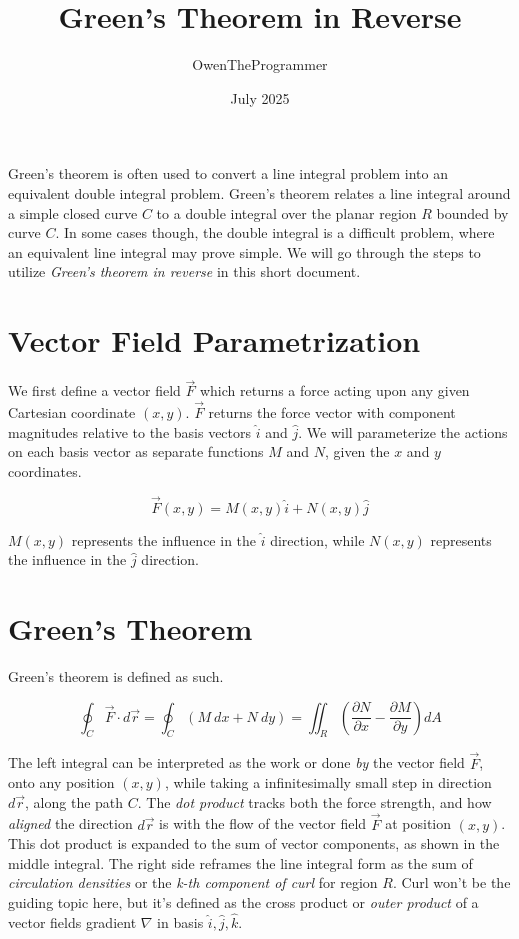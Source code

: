 \documentclass{article}
\title{Green's Theorem in Reverse}
\author{OwenTheProgrammer}
\date{July 2025}
\begin{document}
\maketitle

Green's theorem is often used to convert a line integral problem into an equivalent double integral problem. Green's theorem relates a line integral around a simple closed curve $C$ to a double integral over the planar region $R$ bounded by curve $C$. In some cases though, the double integral is a difficult problem, where an equivalent line integral may prove simple. We will go through the steps to utilize \emph{Green's theorem in reverse} in this short document.

\section{Vector Field Parametrization}

We first define a vector field $\vec{F}$ which returns a force acting upon any given Cartesian coordinate $(x, y)$. $\vec{F}$ returns the force vector with component magnitudes relative to the basis vectors $\hat{i}$ and $\hat{j}$. We will parameterize the actions on each basis vector as separate functions $M$ and $N$, given the $x$ and $y$ coordinates.

\begin{equation}\label{eq:VectorField}
    \vec{F}(x, y) = M(x, y)\hat{i} + N(x, y)\hat{j}
\end{equation}

$M(x, y)$ represents the influence in the $\hat{i}$ direction, while $N(x, y)$ represents the influence in the $\hat{j}$ direction.

\section{Green's Theorem}

Green's theorem is defined as such.

\begin{equation}\label{eq:GreensTheorem}
    \oint_C{\vec{F}\cdot d\vec{r}} = \oint_C{\left(M\:dx + N\:dy\right)} = \iint_R{\left(\frac{\partial N}{\partial x} - \frac{\partial M}{\partial y}\right)} dA
\end{equation}

The left integral can be interpreted as the work or  done \emph{by} the vector field $\vec{F}$, onto any position $(x, y)$, while taking a infinitesimally small step in direction $d\vec{r}$, along the path $C$.
The \emph{dot product} tracks both the force strength, and how \emph{aligned} the direction $d\vec{r}$ is with the flow of the vector field $\vec{F}$ at position $(x, y)$. This dot product is expanded to the sum of vector components, as shown in the middle integral. The right side reframes the line integral form as the sum of \emph{circulation densities} or the \emph{k-th component of curl} for region $R$. Curl won't be the guiding topic here, but it's defined as the cross product or \emph{outer product} of a vector fields gradient $\nabla$ in basis $\hat{i}, \hat{j}, \hat{k}$.
\end{document}
